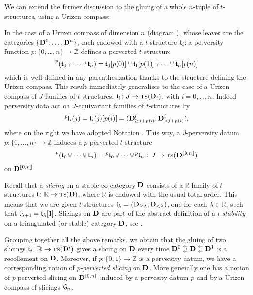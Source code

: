 We can extend the former discussion to the gluing of a whole $n$\hyp{}tuple of $t$\hyp{}structures, using a Urizen compass:
\begin{remark}\label{rem.urizen}
In the case of a Urizen compass of dimension $n$ (diagram ), whose leaves are the categories $\{\mathbf{D}^0 ,\dots, \mathbf{D}^n\}$, each endowed with a $t$\hyp{}structure $\mathfrak{t}_i$; a perversity function $p\colon \{0,\dots,n\}\to \mathbb{Z}$ defines a perverted $t$\hyp{}structure
\[
\prescript{p}{}{(\tee_0\glue \cdots \glue \tee_n)} = \tee_0[p(0)]\glue \tee_1[p(1)]\glue \cdots \glue \tee_n[p(n)]
\]
which is well\hyp{}defined in any parenthesization thanks to the structure defining the Urizen compass.
This result  immediately generalizes to the case of a Urizen compass of $J$\hyp{}families of $t$\hyp{}structures, $\mathfrak{t}_i\colon J\to  \text{\scshape ts} (\mathbf{D}_i)$, with $i=0,\dots, n$. Indeed perversity data act on $J$\hyp{}equivariant families of $t$\hyp{}structures by
\[
\prescript{p}{}{\mathfrak{t}}_i(j) = \mathfrak{t}_i(j)[p(i)] = (\mathbf{D}^i_{\ge j+p(i)}, \mathbf{D}^i_{<j+p(i)}),
\]
where on the right we have adopted Notation . 
This way, a $J$\hyp{}perversity datum $p\colon \{0,\dots,n\}\to \mathbb{Z}$ induces a $p$\hyp{}perverted $t$\hyp{}structure
\[
\prescript{p}{}{(\tee_0\glue \cdots \glue \tee_n)}=\prescript{p}{}{\tee}_0\glue \cdots \glue \prescript{p}{}{\tee}_n\,\colon\, J\to \ts(\D^{\llbracket 0,n\rrbracket})
\]
on $\mathbf{D}^{\llbracket 0,n\rrbracket}$.
\end{remark}


\begin{remark}
Recall that a \emph{slicing} on a stable $\infty$\hyp{}category $\mathbf{D}$ consists of a $\mathbb{R}$\hyp{}family of $t$\hyp{}structures $\mathfrak{t}\colon \mathbb{R}\to  \text{\scshape ts} (\mathbf{D})$, where $\mathbb R$ is endowed with the usual total order. This means that we are given $t$\hyp{}structures $\mathfrak{t}_\lambda = (\mathbf{D}_{\ge \lambda}, \mathbf{D}_{ < \lambda})$, one for each $\lambda\in\mathbb R$, such that $\mathfrak{t}_{\lambda +1} = \mathfrak{t}_\lambda[1]$. Slicings on $\mathbf{D}$ are part of the abstract definition of a $t$\hyp{}\emph{stability} on a triangulated (or stable) category $\mathbf{D}$, see \cite{Brid,GKR}.

Grouping together all the above remarks, we obtain that the gluing of two slicings $\mathfrak{t}_i\colon \mathbb{R}\to  \text{\scshape ts} (\mathbf{D}^i)$ gives a slicing on $\mathbf{D}$ every time $\D^0\lrlarrows \D\lrlarrows \D^1$ is a recollement on $\mathbf{D}$. Moreover, if $p\colon \{0,1\}\to \mathbb{Z}$ is a perversity datum, we have a corresponding notion of \emph{$p$\hyp{}perverted slicing} on $\mathbf{D}$. More generally one has a notion of $p$\hyp{}perverted slicing on $\mathbf{D}^{\llbracket 0,n\rrbracket}$ induced by a pervesity datum $p$ and by a Urizen compass of slicings $\mathsf{G}_n$.
\end{remark}